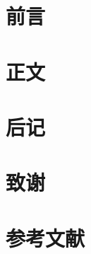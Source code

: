 \documentclass{ctexbook}
\begin{document}
\frontmatter
\chapter{前言}
\tableofcontents
{}

\mainmatter
\chapter{正文}

\backmatter
\chapter{后记}
\chapter{致谢}
\chapter{参考文献}
\end{document}
